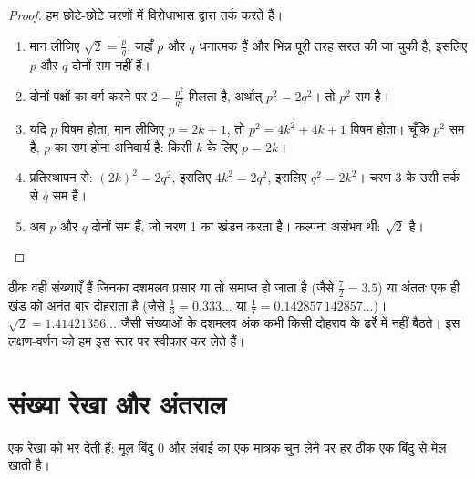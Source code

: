\begin{proof}
हम छोटे-छोटे चरणों में विरोधाभास द्वारा तर्क करते हैं।
\begin{enumerate}
  \item मान लीजिए $\sqrt 2 = \frac{p}{q}$, जहाँ $p$ और $q$ धनात्मक  हैं
        और भिन्न पूरी तरह सरल की जा चुकी है, इसलिए $p$ और $q$
        दोनों सम नहीं हैं।
  \item दोनों पक्षों का वर्ग करने पर $2 = \frac{p^2}{q^2}$ मिलता है, अर्थात्
        $p^2 = 2q^2$। तो $p^2$ सम है।
  \item यदि $p$ विषम होता, मान लीजिए $p = 2k+1$, तो
        $p^2 = 4k^2 + 4k + 1$ विषम होता। चूँकि $p^2$ सम है, $p$ का सम होना
        अनिवार्य है: किसी  $k$ के लिए $p = 2k$।
  \item प्रतिस्थापन से: $(2k)^2 = 2q^2$, इसलिए $4k^2 = 2q^2$, इसलिए
        $q^2 = 2k^2$। चरण 3 के उसी तर्क से $q$ सम है।
  \item अब $p$ और $q$ दोनों सम हैं, जो चरण 1 का खंडन करता है।
        कल्पना असंभव थी: $\sqrt 2$  है।
\end{enumerate}
\end{proof}

\begin{remark}
 ठीक वही संख्याएँ हैं जिनका दशमलव प्रसार या तो समाप्त हो
जाता है (जैसे $\frac72 = 3.5$) या अंततः एक ही खंड को अनंत बार दोहराता है
(जैसे $\frac13 = 0.333\dots$ या $\frac{1}{7} = 0.142857\,142857\dots$)।
$\sqrt2 = 1.41421356\dots$ जैसी  संख्याओं के दशमलव अंक कभी किसी दोहराव के ढर्रे में
नहीं बैठते। इस लक्षण-वर्णन को हम इस स्तर पर स्वीकार कर लेते हैं।
\end{remark}

\section{संख्या रेखा और अंतराल}

 एक रेखा को भर देती हैं: मूल बिंदु $0$ और लंबाई का एक
मात्रक चुन लेने पर हर  ठीक एक बिंदु से मेल खाती है।

